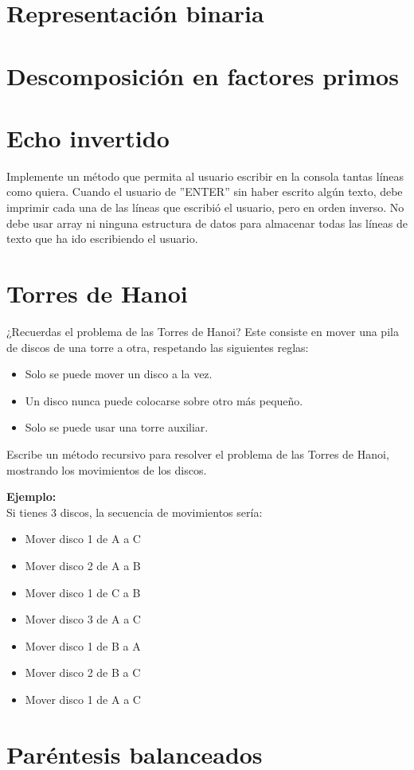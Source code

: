 \section{Representación binaria}


\section{Descomposición en factores primos}  
  

\section{Echo invertido}
Implemente un método que permita al usuario escribir en la consola tantas líneas como quiera. Cuando el usuario de ''ENTER'' sin haber escrito algún texto, debe imprimir cada una de las líneas que escribió el usuario, pero en orden inverso. No debe usar array ni ninguna estructura de datos para almacenar todas las líneas de texto que ha ido escribiendo el usuario.

\section{Torres de Hanoi}
¿Recuerdas el problema de las Torres de Hanoi? Este consiste en mover una pila de discos de una torre a otra, respetando las siguientes reglas:
\begin{itemize}
    \item Solo se puede mover un disco a la vez.
    \item Un disco nunca puede colocarse sobre otro más pequeño.
    \item Solo se puede usar una torre auxiliar.
\end{itemize}

Escribe un método recursivo para resolver el problema de las Torres de Hanoi, mostrando los movimientos de los discos.

\textbf{Ejemplo:}\\
Si tienes 3 discos, la secuencia de movimientos sería:
\begin{itemize}
    \item Mover disco 1 de A a C
    \item Mover disco 2 de A a B
    \item Mover disco 1 de C a B
    \item Mover disco 3 de A a C
    \item Mover disco 1 de B a A
    \item Mover disco 2 de B a C
    \item Mover disco 1 de A a C
\end{itemize}

\section{Paréntesis balanceados}

